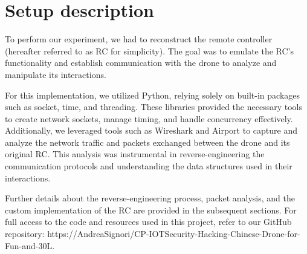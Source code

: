 \section{Setup description}
To perform our experiment, we had to reconstruct the remote controller (hereafter referred to as RC for simplicity). The goal was to emulate the RC's functionality and establish communication with the drone to analyze and manipulate its interactions.

For this implementation, we utilized Python, relying solely on built-in packages such as socket, time, and threading. These libraries provided the necessary tools to create network sockets, manage timing, and handle concurrency effectively. Additionally, we leveraged tools such as Wireshark and Airport to capture and analyze the network traffic and packets exchanged between the drone and its original RC. This analysis was instrumental in reverse-engineering the communication protocols and understanding the data structures used in their interactions.

Further details about the reverse-engineering process, packet analysis, and the custom implementation of the RC are provided in the subsequent sections. For full access to the code and resources used in this project, refer to our GitHub repository: https://AndreaSignori/CP-IOTSecurity-Hacking-Chinese-Drone-for-Fun-and-30L.

\begin{figure}[h]
    \begin{minipage}{.48\textwidth}
        \label{tab:programs_used}
        \vspace{.5\baselineskip}
    \end{minipage}
\end{figure}
